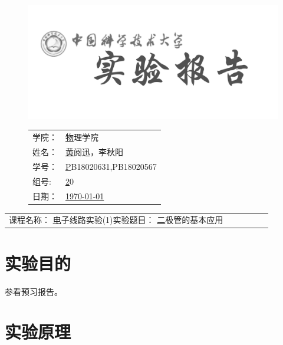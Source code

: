 \documentclass[a4paper,11pt,UTF8]{ctexart}
\newcommand{\major}{物理学院}
\newcommand{\name}{黄阅迅，李秋阳}
\newcommand{\stuid}{PB18020631,PB18020567}
\newcommand{\group}{20}
\newcommand{\newdate}{\today}
\newcommand{\course}{电子线路实验(1)}
\newcommand{\newtitle}{二极管的基本应用}
\begin{document}
\thispagestyle{empty}
\begin{figure}[h]
  \begin{minipage}{0.6\linewidth}
    \centerline{\includegraphics[width=\linewidth]{logo.png}}
  \end{minipage}
  \hfill
  \begin{minipage}{.4\linewidth}
    \raggedleft
    \begin{tabular*}{.8\linewidth}{ll}
      学院： & \underline\major   \\
      姓名： & \underline\name    \\
      学号： & \underline\stuid   \\
      组号:  & \underline\group   \\
      日期： & \underline\newdate \\
    \end{tabular*}
  \end{minipage}
\end{figure}

\begin{table}[!htbp]
  \centering
  \begin{tabular*}{\linewidth}{llllll}
    课程名称：  \underline\course   \qquad\qquad 实验题目：  \underline\newtitle  
  \end{tabular*}
\end{table}


\section{实验目的}

参看预习报告。

\section{实验原理}
\end{document}
